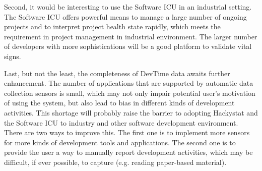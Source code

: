 Second, it would be interesting to use the Software ICU in an industrial setting. The Software ICU offers powerful means to manage a large number of ongoing projects and to interpret project health state rapidly, which meets the requirement in project management in industrial environment. The larger number of developers with more sophistications will be a good platform to validate vital signs. 
 
Last, but not the least, the completeness of DevTime data awaits further enhancement. The number of applications that are supported by automatic data collection sensors is small, which may not only impair potential user's motivation of using the system, but also lead to bias in different kinds of development activities. This shortage will probably raise the barrier to adopting Hackystat and the Software ICU to industry and other software development environment. There are two ways to improve this. The first one is to implement more sensors for more kinds of development tools and applications. The second one is to provide the user a way to manually report development activities, which may be difficult, if ever possible, to capture (e.g. reading paper-based material).


